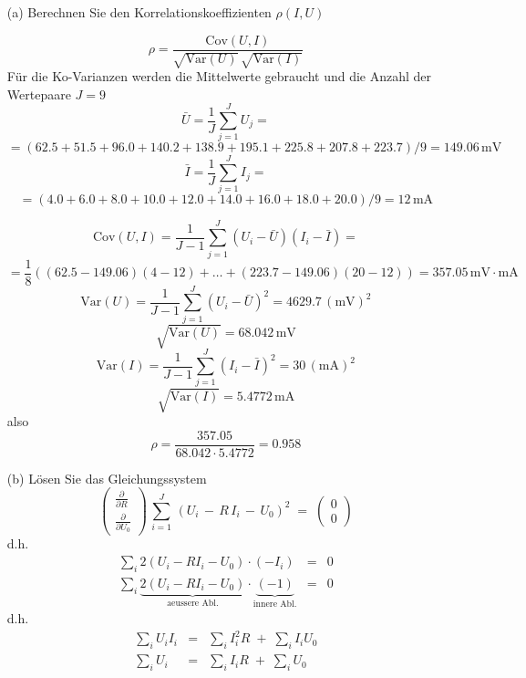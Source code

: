 \begin{itemize}
\item[(a)] Berechnen Sie den Korrelationskoeffizienten $\rho(I, U)$

$$
\rho = \frac{\mathrm{Cov}(U,I)}{\sqrt{\mathrm{Var}(U)} \, \sqrt{\mathrm{Var}(I)}}
$$
Für die Ko-Varianzen werden die Mittelwerte gebraucht und die Anzahl der Wertepaare $J = 9$
$$
\bar U = \frac{1}{J} \sum\limits_{j=1}^J  U_j =
$$
$$
=  (62.5 +   51.5 +   96.0 + 140.2 + 138.9 + 195.1 + 225.8 + 207.8 + 223.7)/9 = 149.06 \, \mathrm{m V}
$$
$$
\bar I = \frac{1}{J} \sum\limits_{j=1}^J I_j =
$$
$$
= (4.0 +  6.0 + 8.0 + 10.0 + 12.0 + 14.0 + 16.0 + 18.0 + 20.0)/9 = 12  \, \mathrm{m A}
$$

$$
\mathrm{Cov}(U,I) = \frac{1}{J-1} \sum\limits_{j=1}^J (U_i - \bar U) (I_i - \bar I) =
$$
$$
= \frac{1}{8}\left( (62.5 - 149.06) (4-12) + \dots + (223.7 - 149.06) (20 - 12) \right)
= 357.05 \, \mathrm{m V} \cdot \mathrm{m A}
$$
$$
\mathrm{Var}(U) = \frac{1}{J-1} \sum\limits_{j=1}^J (U_i - \bar U)^2 = 4629.7 \, (\mathrm{m V})^2
$$
$$
\sqrt{\mathrm{Var}(U)} = 68.042 \, \mathrm{m V}
$$
$$
\mathrm{Var}(I) = \frac{1}{J-1} \sum\limits_{j=1}^J (I_i - \bar I)^2 = 30 \, (\mathrm{m A})^2
$$
$$
\sqrt{\mathrm{Var}(I)} = 5.4772 \, \mathrm{m A}
$$
also
$$
\rho = \frac{357.05}{68.042 \cdot 5.4772} = 0.958
$$
\item[(b)] Lösen Sie das Gleichungssystem
\begin{equation*}
\left(\begin{array}{c}
\frac{\partial}{\partial R}\\
\frac{\partial}{\partial U_0}
\end{array}\right)
\, \sum_{i = 1}^J \, \left(U_i \, - \, R \, I_i  \, - \,  U_0\right)^2 \; = \;
\left(\begin{array}{c}
0\\
0
\end{array}\right)
\end{equation*}
d.h.
$$
\begin{array}{ccc}
\sum_i 2 (U_i - R I_i - U_0) \cdot (-I_i) & = & 0 \\
\sum_i \underbrace{2 (U_i - R I_i - U_0)}_{\text{aeussere Abl.}} \cdot
 \underbrace{(-1)}_{\text{innere Abl.}} & = & 0
\end{array}
$$
d.h.
$$
\begin{array}{ccc}
\sum_i U_i I_i & = & \sum_i I_i^2 R \; + \;  \sum_i I_i U_0 \\
\sum_i U_i & = & \sum_i I_i R \; + \;  \sum_i U_0
\end{array}
$$
\end{itemize}
